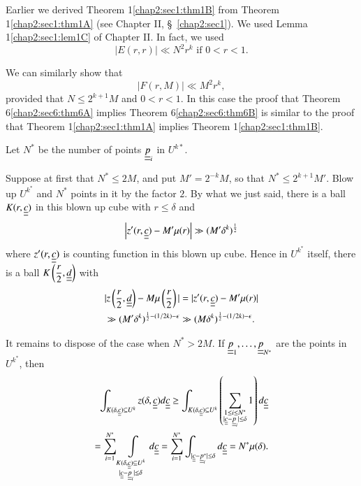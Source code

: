 Earlier we derived Theorem 1\ref{chap2:sec1:thm1B} from Theorem 1\ref{chap2:sec1:thm1A} (see Chapter II, \S\ \ref{chap2:sec1}). We used Lemma 1\ref{chap2:sec1:lem1C} of Chapter II. In fact, we used
$$
|E(r, r)| \ll N^{2} r^{k} \text{ if } 0 < r < 1.
$$ 

We can similarly show that
$$
|F(r, M)| \ll M^{2} r^{k},
$$
provided that $N \leq 2^{k+1} M$ and $0 < r < 1$. In this case the proof that Theorem 6\ref{chap2:sec6:thm6A} implies Theorem 6\ref{chap2:sec6:thm6B} is similar to the proof that Theorem 1\ref{chap2:sec1:thm1A} implies Theorem 1\ref{chap2:sec1:thm1B}. 

Let $N^{*}$ be the number of points $\underline{\underline{p}}_{i}$ in $U^{k*}$.

Suppose at first that $N^{*} \leq 2M$, and put $M' = 2^{-k} M$, so that $N^{*} \leq 2^{k+1} M'$. Blow up $U^{k^*}$ and $N^{*}$ points in it by the factor $2$. By what we just said, there is a ball $K(r, \underline{\underline{c}})$ in this blown up cube with $r \leq \delta$ and
\begin{equation*}
\left|z' (r, \underline{\underline{c}}) - M' \mu(r)\right| \gg (M' \delta^{k})^{\frac{1}{2}}
\end{equation*}
where $z'(r, \underline{\underline{c}})$ is counting function in this blown up cube. Hence in $U^{k^*}$ itself, there is a ball $K\left(\dfrac{r}{2}, \underline{\underline{d}}\right)$ with
\begin{align*}
& |z \left(\frac{r}{2}, \underline{\underline{d}}\right) - M\mu \left(\frac{r}{2}\right)| = |z'(r, \underline{\underline{c}}) - M'\mu(r)|\\
& \gg (M' \delta^{k})^{\frac{1}{2} - (1/2k)-\epsilon} \gg (M \delta^{k})^{\frac{1}{2} - (1/2k)-\epsilon}.
\end{align*}\pageoriginale

It remains to dispose of the case when $N^{*} > 2M$. If $\underline{\underline{p}}_{1}, \ldots, \underline{\underline{p}}_{N^*}$ are the points in $U^{k^*}$, then
\begin{align*}
\int_{K(\delta, \underline{\underline{c}}) \subseteq U^{k}} z(\delta, \underline{\underline{c}}) d\underline{\underline{c}} \geq \int_{K(\delta, \underline{\underline{c}}) \subseteq U^{k}} \left(\sum_{\substack{1 \leq i \leq N^{*}\\|\underline{\underline{c}}-\underline{\underline{p}}_{i}| \leq \delta}} 1\right) d\underline{\underline{c}}\\
= \sum_{i=1}^{N^{*}} \int\limits_{\substack{K(\delta, \underline{\underline{c}}) \subseteq U^{k}\\|\underline{\underline{c}} - \underline{\underline{p}}_{i}| \leq \delta}} d\underline{\underline{c}} = \sum_{i=1}^{N^{*}} \int_{|\underline{\underline{c}} - \underline{\underline{p}}_{i}^{*}| \leq \delta} d\underline{\underline{c}} = N^{*} \mu (\delta).
\end{align*}

